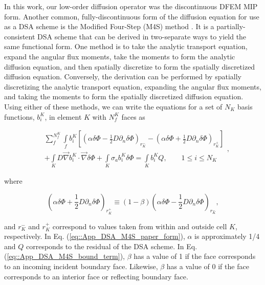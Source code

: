 In this work, our low-order diffusion operator was the discontinuous DFEM MIP form. Another common, fully-discontinuous form of the diffusion equation for use as a DSA scheme is the Modified Four-Step (M4S) method \cite{ref::dsa_DFEM_adams_martin}. It is a partially-consistent DSA scheme that can be derived in two-separate ways to yield the same functional form. One method is to take the analytic transport equation, expand the angular flux moments, take the moments to form the analytic diffusion equation, and then spatially discretize to form the spatially discretized diffusion equation. Conversely, the derivation can be performed by spatially discretizing the analytic transport equation, expanding the angular flux moments, and taking the moments to form the spatially discretized diffusion equation. Using either of these methods, we can write the equations for a set of $N_K$ basis functions, $b_i^K$, in element $K$ with $N_f^K$ faces as

\begin{equation}
\label{eq::App_DSA_M4S_paper_form}
\begin{aligned}
&\sum_{f}^{N_f^K} \int\limits_{f} b_i^K \left[  \left(  \alpha \delta \Phi - \frac{1}{2} D \partial_n \delta \Phi \right)_{r_K^-} - \left(  \alpha \delta \Phi + \frac{1}{2} D \partial_n \delta \Phi \right)_{r_K^+} \right] \\
&+ \int\limits_{K} D \vec{\nabla} b_i^K \cdot \vec{\nabla} \delta \Phi + \int\limits_{K} \sigma_a  b_i^K \delta \Phi = \int\limits_{K}  b_i^K Q , \qquad 1 \leq i \leq N_K
\end{aligned},
\end{equation}

\noindent where 

\begin{equation}
\label{eq::App_DSA_M4S_bound_term}
\left(  \alpha \delta \Phi + \frac{1}{2} D \partial_n \delta \Phi \right)_{r_K^+} \equiv \left(  1 - \beta \right)  \left(  \alpha \delta \Phi - \frac{1}{2} D \partial_n \delta \Phi \right)_{r_K^-} ,
\end{equation}

\noindent and $r_K^-$ and $r_K^+$ correspond to values taken from within and outside cell $K$, respectively. In Eq. (\ref{eq::App_DSA_M4S_paper_form}), $\alpha$ is approximately 1/4 and $Q$ corresponds to the residual of the DSA scheme. In Eq. (\ref{eq::App_DSA_M4S_bound_term}), $\beta$ has a value of 1 if the face corresponds to an incoming incident boundary face. Likewise, $\beta$ has a value of 0 if the face corresponds to an interior face or reflecting boundary face.

